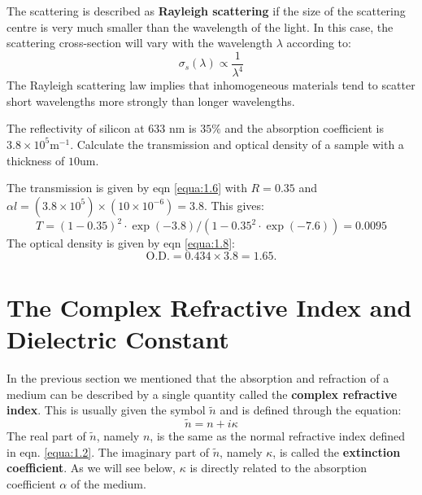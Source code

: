 \documentclass[12pt]{book}
\def\um{\mathrm{um}}
\def\m{\mathrm{m}}
\begin{document}
The scattering is described as \textbf{Rayleigh scattering} if the size of the scattering centre is very much smaller than the wavelength of the light. In this case, the scattering cross-section will vary with the wavelength $\lambda$ according to:
\begin{equation}\label{equa:1.10}
  \sigma_s(\lambda)\propto\frac{1}{\lambda^4}
\end{equation}
The Rayleigh scattering law implies that inhomogeneous materials tend to scatter short wavelengths more strongly than longer wavelengths.

\begin{Exercise}
  The reflectivity of silicon at 633 nm is $35\%$ and the absorption coefficient is $3.8\times10^5\m^{-1}$. Calculate the transmission and optical density of a sample with a thickness of $10\um$.
\end{Exercise}
\begin{Answer}
  The transmission is given by eqn \ref{equa:1.6} with $R= 0.35$ and $\alpha l=(3.8\times10^5)\times(10\times10^{-6})=3.8$. This gives:$$T=(1-0.35)^2\cdot\exp(-3.8)/(1-0.35^2\cdot\exp(-7.6))=0.0095$$
  The optical density is given by eqn \ref{equa:1.8}:
  \begin{equation*}
    \mathrm{O.D.}=0.434\times3.8=1.65.
  \end{equation*}
\end{Answer}

\section{The Complex Refractive Index and Dielectric Constant}

In the previous section we mentioned that the absorption and refraction of a medium can be described by a single quantity called the \textbf{complex refractive index}. This is usually given the symbol $\tilde{n}$ and is defined through the equation:
\begin{equation}\label{equa:1.11}
  \tilde{n}=n+i\kappa
\end{equation}
The real part of $\tilde{n}$, namely $n$, is the same as the normal refractive index defined in eqn. \ref{equa:1.2}. The imaginary part of $\tilde{n}$, namely $\kappa$, is called the \textbf{extinction coefficient}. As we will see below, $\kappa$ is directly related to the absorption coefficient $\alpha$ of the medium.
\end{document}
